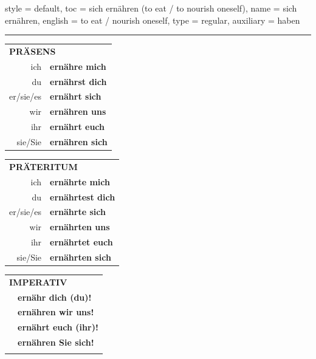 \begin{verbentry}{
  style = {default},
  toc = {sich ernähren (to eat / to nourish oneself)},
  name = {sich ernähren},
  english = {to eat / nourish oneself},
  type = {regular},
  auxiliary = {haben}
}
 
    
     \vspace{5pt}
    \hrule
    \vspace{5pt}

  \begin{tabular}{rl}
     \multicolumn{2}{l}{\textbf{PRÄSENS} }\\
    ich & \textbf{ernähre mich}\\
    du & \textbf{ernährst dich}\\
    er/sie/es & \textbf{ernährt sich}\\
    wir & \textbf{ernähren uns}\\
    ihr & \textbf{ernährt euch}\\
    sie/Sie & \textbf{ernähren sich}\\
  \end{tabular}
  \hfill
     \begin{tabular}{rl}
    \multicolumn{2}{l}{\textbf{PRÄTERITUM} }\\
    ich & \textbf{ernährte mich}\\
    du & \textbf{ernährtest dich}\\
    er/sie/es & \textbf{ernährte sich}\\
    wir & \textbf{ernährten uns}\\
    ihr & \textbf{ernährtet euch}\\
    sie/Sie & \textbf{ernährten sich}\\
  \end{tabular}
  \hfill
  \begin{tabular}{rl}
     \multicolumn{2}{l}{\textbf{IMPERATIV} }\\
   & \textbf{ernähr dich (du)!}\\
   & \textbf{ernähren wir uns!}\\
   & \textbf{ernährt euch (ihr)!}\\
   & \textbf{ernähren Sie sich!}\\
   & \vspace{10pt}
  \end{tabular}

 \vspace{10pt}


\end{verbentry}
